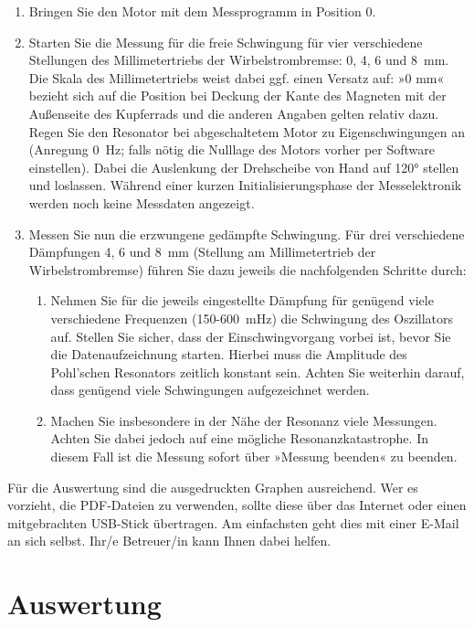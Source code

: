 \begin{enumerate}
	\item Bringen Sie den Motor mit dem Messprogramm in Position 0.
	\item Starten Sie die Messung für die freie Schwingung für vier verschiedene Stellungen des Millimetertriebs der Wirbelstrombremse: 0, 4, 6 und 8~mm. Die Skala des Millimetertriebs weist dabei ggf. einen Versatz auf: »0 mm« bezieht sich auf die Position bei Deckung der Kante des Magneten mit der Außenseite des Kupferrads und die anderen Angaben gelten relativ dazu. Regen Sie den Resonator bei abgeschaltetem Motor zu Eigenschwingungen an (Anregung 0~Hz; falls nötig die Nulllage des Motors vorher per Software einstellen). Dabei die Auslenkung der Drehscheibe von Hand auf 120° stellen und loslassen. Während einer kurzen Initialisierungsphase der Messelektronik werden noch keine Messdaten angezeigt.
	\item Messen Sie nun die erzwungene gedämpfte Schwingung. Für drei verschiedene Dämpfungen 4, 6 und 8~mm (Stellung am Millimetertrieb der Wirbelstrombremse) führen Sie dazu jeweils die nachfolgenden Schritte durch:
	\begin{enumerate}
		\item Nehmen Sie für die jeweils eingestellte Dämpfung für genügend viele verschiedene Frequenzen (150-600~mHz) die Schwingung des Oszillators auf. Stellen Sie sicher, dass 
		der Einschwingvorgang vorbei ist, bevor Sie die Datenaufzeichnung starten. Hierbei muss die Amplitude des Pohl'schen Resonators zeitlich konstant sein. Achten Sie weiterhin darauf, dass genügend viele Schwingungen aufgezeichnet werden.
		\item Machen Sie insbesondere in der Nähe der Resonanz viele Messungen. Achten Sie dabei jedoch auf eine mögliche Resonanzkatastrophe. In diesem Fall ist die Messung sofort über »Messung beenden« zu beenden.
	\end{enumerate}
\end{enumerate}
Für die Auswertung sind die ausgedruckten Graphen ausreichend. Wer es vorzieht, die PDF-Dateien zu verwenden, sollte diese über das Internet oder einen mitgebrachten USB-Stick übertragen. Am einfachsten geht dies mit einer E-Mail an sich selbst. Ihr/e Betreuer/in kann Ihnen dabei helfen.

\section{Auswertung} 


